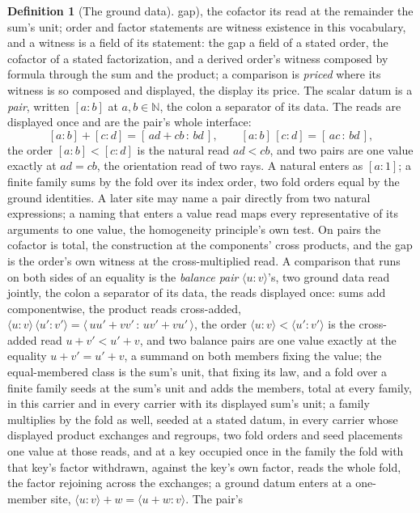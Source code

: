 \documentclass[11pt]{article}
\theoremstyle{definition}
\newtheorem{definition}{Definition}
\begin{document}
\begin{definition}[The ground data]
gap), the cofactor its read at the remainder the sum's unit; order and
factor statements are witness existence in this vocabulary, and a
witness is a field of its statement: the gap a field of a stated
order, the cofactor of a stated factorization, and a derived
order's witness composed by formula through the sum and the
product; a comparison is \emph{priced} where its witness is so
composed and displayed, the display its price. The scalar datum is a \emph{pair}, written
$[a\!:\!b]$ at $a,b\in\mathbb N$, the colon a separator of its
data. The reads are displayed once and are the pair's whole
interface:
\[
[a\!:\!b]+[c\!:\!d]=[\,ad+cb\,:\,bd\,],\qquad
[a\!:\!b]\,[c\!:\!d]=[\,ac\,:\,bd\,],
\]
the order $[a\!:\!b]<[c\!:\!d]$ is the natural read $ad<cb$, and
two pairs are one value exactly at $ad=cb$, the
orientation read of two rays. A natural enters as $[a\!:\!1]$; a
finite family sums by the fold over its index order, two fold
orders equal by the ground identities. A later site
may name a pair directly from
two natural expressions; a naming that enters a value read maps
every representative of its arguments to one value, the
homogeneity principle's own test. On pairs the cofactor is total,
the construction at the components' cross products, and the gap is
the order's own witness at the cross-multiplied read. A
comparison that runs on both sides of an equality is the
\emph{balance pair} $\langle u\!:\!v\rangle$'s, two ground data read
jointly, the colon a separator of its data, the reads displayed
once: sums add componentwise, the product reads cross-added,
$\langle u\!:\!v\rangle\,\langle u'\!:\!v'\rangle
=\langle\,uu'+vv'\,:\,uv'+vu'\,\rangle$, the order
$\langle u\!:\!v\rangle<\langle u'\!:\!v'\rangle$ is the
cross-added read $u+v'<u'+v$, and two balance pairs are one
value exactly at the equality $u+v'=u'+v$, a summand on both
members fixing the value; the equal-membered class is the sum's
unit, that fixing its law, and a fold over a finite family seeds
at the sum's unit and adds the members, total at every family, in
this carrier and in every carrier with its displayed sum's unit; a
family multiplies by the fold as well, seeded at a stated datum, in
every carrier whose displayed product exchanges and regroups, two
fold orders and seed placements one value at those reads, and at a
key occupied once in the family the fold with that key's factor
withdrawn, against the key's own factor, reads the whole fold, the
factor rejoining across the exchanges;
a ground datum enters at a
one-member site,
$\langle u\!:\!v\rangle+w=\langle u+w\!:\!v\rangle$. The pair's

\end{definition}
\end{document}
